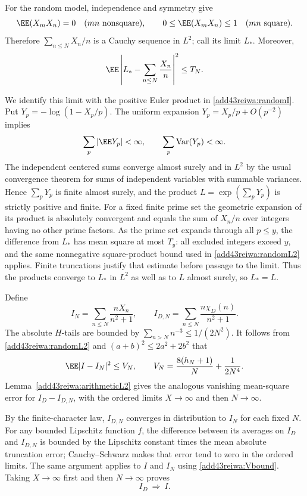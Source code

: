 \documentclass[11pt,a4paper]{article}
\numberwithin{equation}{section}
\theoremstyle{definition}
\theoremstyle{remark}
\begin{document}
For the random model, independence and symmetry give
\[
 \EE(X_mX_n)=0\quad(mn\text{ nonsquare}),\qquad
 0\le\EE(X_mX_n)\le1\quad(mn\text{ square}).
\]
Therefore $\sum_{n\le N}X_n/n$ is a Cauchy sequence in $L^2$;
call its limit $L_*$. Moreover,
\begin{equation}\label{add43reiwa:randomL2}
 \EE\left|L_*-\sum_{n\le N}\frac{X_n}n\right|^2\le T_N.
\end{equation}

We identify this limit with the positive Euler product in
\eqref{add43reiwa:randomI}. Put $Y_p=-\log(1-X_p/p)$. The uniform expansion
$Y_p=X_p/p+O(p^{-2})$ implies
\[
 \sum_p|\EE Y_p|<\infty,\qquad
 \sum_p\operatorname{Var}(Y_p)<\infty.
\]
The independent centered sums converge almost surely and in $L^2$
by the usual convergence theorem for sums of independent variables
with summable variances. Hence $\sum_pY_p$ is finite almost surely,
and the product $L=\exp(\sum_pY_p)$ is strictly positive and finite.
For a fixed finite prime set the geometric expansion of its product
is absolutely convergent and equals the sum of $X_n/n$ over integers
having no other prime factors. As the prime set expands through all
$p\le y$, the difference from $L_*$ has mean square at most $T_y$:
all excluded integers exceed $y$, and the same nonnegative
square-product bound used in \eqref{add43reiwa:randomL2} applies. Finite
truncations justify that estimate before passage to the limit.
Thus the products converge to $L_*$ in $L^2$ as well as to $L$
almost surely, so $L_*=L$.

Define
\[
 I_N=\sum_{n\le N}\frac{nX_n}{n^2+1},\qquad
 I_{D,N}=\sum_{n\le N}\frac{n\chi_D(n)}{n^2+1}.
\]
The absolute $H$-tails are bounded by $\sum_{n>N}n^{-3}\le1/(2N^2)$.
It follows from \eqref{add43reiwa:randomL2} and $(a+b)^2\le2a^2+2b^2$ that
\begin{equation}\label{add43reiwa:Vbound}
 \EE|I-I_N|^2\le V_N,
 \qquad V_N=\frac{8(h_N+1)}N+\frac1{2N^4}.
\end{equation}
Lemma~\ref{add43reiwa:arithmeticL2} gives the analogous vanishing mean-square
error for $I_D-I_{D,N}$, with the ordered limits $X\to\infty$ and
then $N\to\infty$.

By the finite-character law, $I_{D,N}$ converges in distribution to
$I_N$ for each fixed $N$. For any bounded Lipschitz function $f$, the
difference between its averages on $I_D$ and $I_{D,N}$ is bounded
by the Lipschitz constant times the mean absolute truncation error;
Cauchy--Schwarz makes that error tend to zero in the ordered limits.
The same argument applies to $I$ and $I_N$ using \eqref{add43reiwa:Vbound}.
Taking $X\to\infty$ first and then $N\to\infty$ proves
\begin{equation}\label{add43reiwa:weak}
                         I_D\ \Longrightarrow\ I.
\end{equation}
\end{document}
